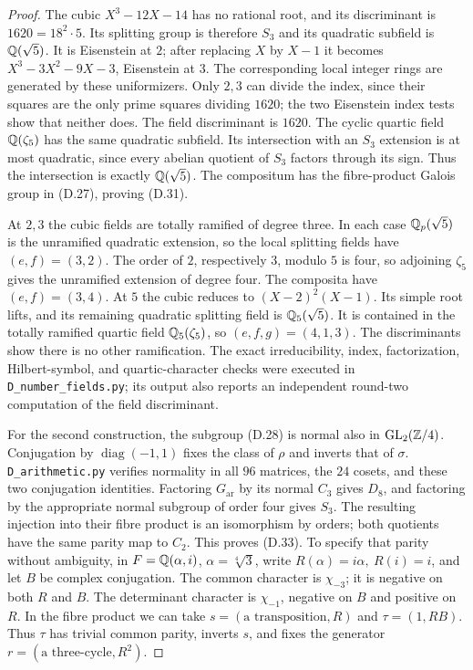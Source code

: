 \begin{proof}
The cubic \(X^3-12X-14\) has no rational root, and its
discriminant is \(1620=18^2\cdot5\).
Its splitting group is therefore \(S_3\) and its quadratic
subfield is \(\mathbb Q(\sqrt5)\).
It is Eisenstein at \(2\); after replacing \(X\) by \(X-1\)
it becomes \(X^3-3X^2-9X-3\), Eisenstein at \(3\).
The corresponding local integer rings are generated by these
uniformizers.  Only \(2,3\) can divide the index, since their
squares are the only prime squares dividing \(1620\);
the two Eisenstein index tests show that neither does.
The field discriminant is \(1620\).
The cyclic quartic field \(\mathbb Q(\zeta_5)\) has the same
quadratic subfield.  Its intersection with an \(S_3\)
extension is at most quadratic, since every abelian quotient
of \(S_3\) factors through its sign.  Thus the intersection
is exactly \(\mathbb Q(\sqrt5)\).  The compositum has the
fibre-product Galois group in (D.27), proving (D.31).

At \(2,3\) the cubic fields are totally ramified of degree
three.  In each case \(\mathbb Q_p(\sqrt5)\) is the unramified
quadratic extension, so the local splitting fields have
\((e,f)=(3,2)\).  The order of \(2\), respectively \(3\),
modulo \(5\) is four, so adjoining \(\zeta_5\) gives the
unramified extension of degree four.  The composita have
\((e,f)=(3,4)\).  At \(5\) the cubic reduces to
\((X-2)^2(X-1)\).  Its simple root lifts, and its remaining
quadratic splitting field is \(\mathbb Q_5(\sqrt5)\).
It is contained in the totally ramified quartic field
\(\mathbb Q_5(\zeta_5)\), so \((e,f,g)=(4,1,3)\).
The discriminants show there is no other ramification.
The exact irreducibility, index, factorization, Hilbert-symbol,
and quartic-character checks were executed in
\texttt{D\_number\_fields.py}; its output also reports an
independent round-two computation of the field discriminant.

For the second construction, the subgroup (D.28) is normal
also in \(\operatorname{GL}_2(\mathbb Z/4)\).  Conjugation by
\(\operatorname{diag}(-1,1)\) fixes the class of \(\rho\)
and inverts that of \(\sigma\).
\texttt{D\_arithmetic.py} verifies normality in all \(96\)
matrices, the \(24\) cosets, and these two conjugation
identities.  Factoring \(G_{\mathrm{ar}}\) by its normal
\(C_3\) gives \(D_8\), and factoring by the appropriate
normal subgroup of order four gives \(S_3\).
The resulting injection into their fibre product is an
isomorphism by orders; both quotients have the same parity
map to \(C_2\).  This proves (D.33).
To specify that parity without ambiguity, in
\(F=\mathbb Q(\alpha,i)\), \(\alpha=\sqrt[4]{3}\), write
\(R(\alpha)=i\alpha,\ R(i)=i\), and let \(B\) be complex
conjugation.  The common character is \(\chi_{-3}\);
it is negative on both \(R\) and \(B\).
The determinant character is \(\chi_{-1}\), negative
on \(B\) and positive on \(R\).
In the fibre product we can take
\(s=(\text{a transposition},R)\) and
\(\tau=(1,RB)\).
Thus \(\tau\) has trivial common parity, inverts \(s\),
and fixes the generator \(r=(\text{a three-cycle},R^2)\).


\end{proof}
